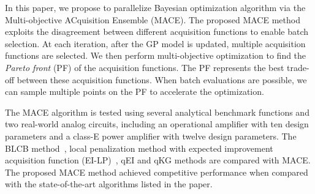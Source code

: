In this paper, we propose to parallelize Bayesian optimization algorithm
via the Multi-objective ACquisition Ensemble (MACE). The proposed MACE method
exploits the disagreement between different acquisition functions to enable
batch selection. At each iteration, after the GP model is updated, multiple
acquisition functions are selected. We then perform multi-objective
optimization to find the \emph{Pareto front} (PF) of the acquisition functions.
The PF represents the best trade-off between these acquisition functions. When
batch evaluations are possible, we can sample multiple points on the PF to accelerate the optimization.

The MACE algorithm is tested using several analytical benchmark functions and
two real-world analog circuits, including an operational amplifier with ten
design parameters and a class-E power amplifier with twelve design parameters.
The BLCB method~\cite{desautels2014parallelizing}, local penalization method with expected improvement
acquisition function (EI-LP)~\cite{gonzalez2016batch}, qEI \cite{qEI} and qKG \cite{wu2016parallel} methods are compared with
MACE. The proposed MACE method achieved competitive performance when compared
with the state-of-the-art algorithms listed in the paper.
